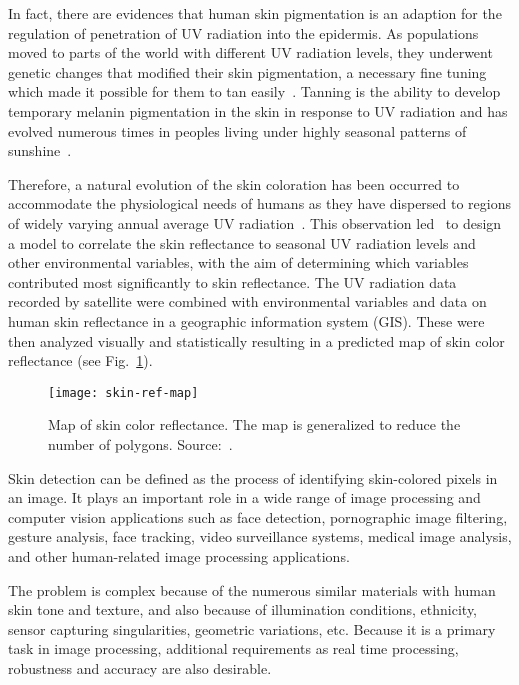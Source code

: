 In fact, there are evidences that human skin pigmentation is an adaption for the regulation of penetration of UV radiation into the epidermis. As populations moved to parts of the world with different UV radiation levels, they underwent genetic changes that modified their skin pigmentation, a necessary fine tuning which made it possible for them to tan easily~\citep{jablonski:00}. Tanning is the ability to develop temporary melanin pigmentation in the skin in response to UV radiation and has evolved numerous times in peoples living under highly seasonal patterns of sunshine~\citep{jablonski:10}.

Therefore, a natural evolution of the skin coloration has been occurred to accommodate the physiological needs of humans as they have dispersed to regions of widely varying annual average UV radiation~\citep{jablonski:10}. This observation led~\citet{chaplin:04} to design a model to correlate the skin reflectance to seasonal UV radiation levels and other environmental variables, with the aim of determining which variables contributed most significantly to skin reflectance. The UV radiation data recorded by satellite were combined with environmental variables and data on human skin reflectance in a geographic information system (GIS). These were then analyzed visually and statistically resulting in a predicted map of skin color reflectance (see Fig.~\ref{fig:skin-ref-map}).

\begin{figure}[!hb]
  \centering
  \texttt{[image: skin-ref-map]}
  \caption[Map of skin color reflectance]{Map of skin color reflectance. The map is generalized to reduce the number of polygons. Source:~\citet{chaplin:04}.}
  \label{fig:skin-ref-map} 
\end{figure}

Skin detection can be defined as the process of identifying skin-colored pixels in an image. It plays an important role in a wide range of image processing and computer vision applications such as face detection, pornographic image filtering, gesture analysis, face tracking, video surveillance systems, medical image analysis, and other human-related image processing applications.

The problem is complex because of the numerous similar materials with human skin tone and texture, and also because of illumination conditions, ethnicity, sensor capturing singularities, geometric variations, etc. Because it is a primary task in image processing, additional requirements as real time processing, robustness and accuracy are also desirable.

